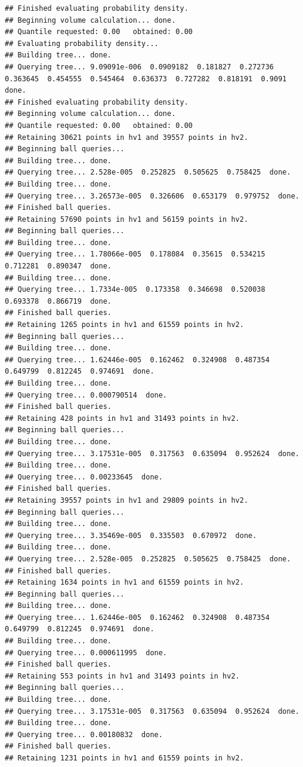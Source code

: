 \documentclass[12pt]{article}\usepackage[]{graphicx}\usepackage[]{color}
\makeatletter
\newenvironment{kframe}{%
 \def\at@end@of@kframe{}%
 \ifinner\ifhmode%
  \def\at@end@of@kframe{\end{minipage}}%
  \begin{minipage}{\columnwidth}%
 \fi\fi%
 \def\FrameCommand##1{\hskip\@totalleftmargin \hskip-\fboxsep
 \colorbox{shadecolor}{##1}\hskip-\fboxsep
     \hskip-\linewidth \hskip-\@totalleftmargin \hskip\columnwidth}%
 \MakeFramed {\advance\hsize-\width
   \@totalleftmargin\z@ \linewidth\hsize
   \@setminipage}}%
 {\par\unskip\endMakeFramed%
 \at@end@of@kframe}
\newenvironment{knitrout}{}{} %
\makeatother
\begin{document}
\begin{knitrout}
\begin{kframe}
\begin{verbatim}
## Finished evaluating probability density.
## Beginning volume calculation... done. 
## Quantile requested: 0.00   obtained: 0.00
## Evaluating probability density...
## Building tree... done.
## Querying tree... 9.09091e-006  0.0909182  0.181827  0.272736  0.363645  0.454555  0.545464  0.636373  0.727282  0.818191  0.9091  done.
## Finished evaluating probability density.
## Beginning volume calculation... done. 
## Quantile requested: 0.00   obtained: 0.00
## Retaining 30621 points in hv1 and 39557 points in hv2.
## Beginning ball queries... 
## Building tree... done.
## Querying tree... 2.528e-005  0.252825  0.505625  0.758425  done.
## Building tree... done.
## Querying tree... 3.26573e-005  0.326606  0.653179  0.979752  done.
## Finished ball queries. 
## Retaining 57690 points in hv1 and 56159 points in hv2.
## Beginning ball queries... 
## Building tree... done.
## Querying tree... 1.78066e-005  0.178084  0.35615  0.534215  0.712281  0.890347  done.
## Building tree... done.
## Querying tree... 1.7334e-005  0.173358  0.346698  0.520038  0.693378  0.866719  done.
## Finished ball queries. 
## Retaining 1265 points in hv1 and 61559 points in hv2.
## Beginning ball queries... 
## Building tree... done.
## Querying tree... 1.62446e-005  0.162462  0.324908  0.487354  0.649799  0.812245  0.974691  done.
## Building tree... done.
## Querying tree... 0.000790514  done.
## Finished ball queries. 
## Retaining 428 points in hv1 and 31493 points in hv2.
## Beginning ball queries... 
## Building tree... done.
## Querying tree... 3.17531e-005  0.317563  0.635094  0.952624  done.
## Building tree... done.
## Querying tree... 0.00233645  done.
## Finished ball queries. 
## Retaining 39557 points in hv1 and 29809 points in hv2.
## Beginning ball queries... 
## Building tree... done.
## Querying tree... 3.35469e-005  0.335503  0.670972  done.
## Building tree... done.
## Querying tree... 2.528e-005  0.252825  0.505625  0.758425  done.
## Finished ball queries. 
## Retaining 1634 points in hv1 and 61559 points in hv2.
## Beginning ball queries... 
## Building tree... done.
## Querying tree... 1.62446e-005  0.162462  0.324908  0.487354  0.649799  0.812245  0.974691  done.
## Building tree... done.
## Querying tree... 0.000611995  done.
## Finished ball queries. 
## Retaining 553 points in hv1 and 31493 points in hv2.
## Beginning ball queries... 
## Building tree... done.
## Querying tree... 3.17531e-005  0.317563  0.635094  0.952624  done.
## Building tree... done.
## Querying tree... 0.00180832  done.
## Finished ball queries. 
## Retaining 1231 points in hv1 and 61559 points in hv2.

\end{verbatim}
\end{kframe}
\end{knitrout}
\end{document}
